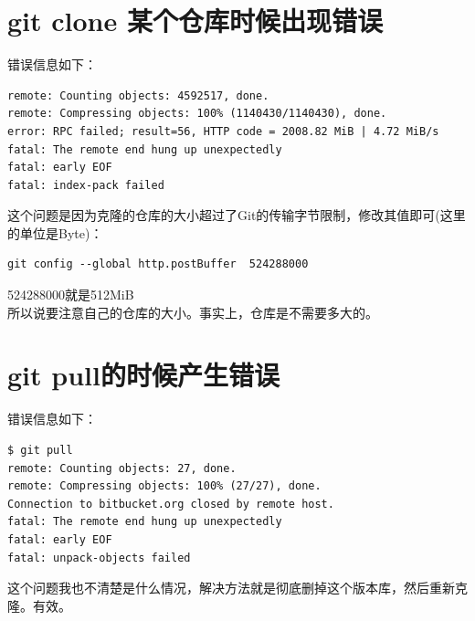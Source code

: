 \documentclass[a4paper,12pt]{ctexbook}
\begin{document}
\begin{flushleft}
\section{git clone 某个仓库时候出现错误}
错误信息如下：
\begin{verbatim}
remote: Counting objects: 4592517, done.
remote: Compressing objects: 100% (1140430/1140430), done.
error: RPC failed; result=56, HTTP code = 2008.82 MiB | 4.72 MiB/s
fatal: The remote end hung up unexpectedly
fatal: early EOF
fatal: index-pack failed
\end{verbatim}
这个问题是因为克隆的仓库的大小超过了Git的传输字节限制，修改其值即可(这里的单位是Byte)：\\
\begin{verbatim}
git config --global http.postBuffer  524288000
\end{verbatim}
524288000就是512MiB\\
所以说要注意自己的仓库的大小。事实上，仓库是不需要多大的。

\section{git pull的时候产生错误}
错误信息如下：
\begin{verbatim}
$ git pull
remote: Counting objects: 27, done.
remote: Compressing objects: 100% (27/27), done.
Connection to bitbucket.org closed by remote host.
fatal: The remote end hung up unexpectedly
fatal: early EOF
fatal: unpack-objects failed
\end{verbatim}
这个问题我也不清楚是什么情况，解决方法就是彻底删掉这个版本库，然后重新克隆。有效。

\end{flushleft}
\end{document}
